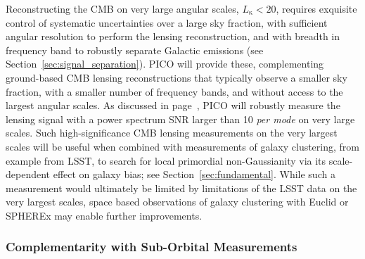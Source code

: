 \documentclass[PICOReport.tex]{subfiles}
\begin{document}
Reconstructing the CMB  on very large angular scales, $L_\mathrm{\kappa}<20$, requires exquisite control of systematic uncertainties over a large sky fraction, with sufficient angular resolution to perform the lensing reconstruction, and with breadth in frequency band to robustly separate Galactic emissions (see Section~\ref{sec:signal_separation}). PICO will provide these, complementing ground-based CMB lensing reconstructions that typically observe a smaller sky fraction, with a smaller number of frequency bands, and without access to the largest angular scales. As discussed in page~\pageref{lensing}, PICO will robustly measure the lensing signal with a power spectrum \ac{SNR} larger than 10 {\it per mode} on very large scales. Such high-significance CMB lensing measurements on the very largest scales will be useful when combined with measurements of galaxy clustering, from example from LSST, to search for local primordial non-Gaussianity via its scale-dependent effect on galaxy bias; see Section~\ref{sec:fundamental}.
While such a measurement would ultimately be limited by limitations of the LSST data on the very largest scales, space based observations of galaxy clustering with Euclid or SPHEREx may enable further improvements.


\subsubsection{Complementarity with Sub-Orbital Measurements}

\end{document}
